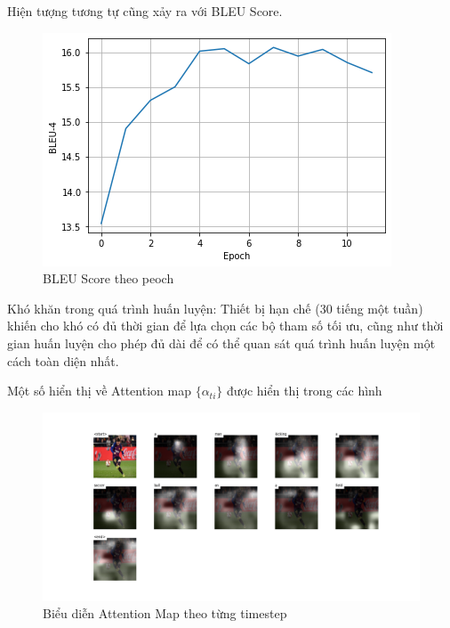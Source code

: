 \documentclass[14pt, a4paper]{article}
\numberwithin{equation}{section}
\numberwithin{algorithm}{section}
\numberwithin{figure}{section}
\numberwithin{table}{section}
\numberwithin{dl}{section}
\numberwithin{md}{section}
\numberwithin{bd}{section}
\numberwithin{dn}{section}
\numberwithin{hq}{section}
\begin{document}
    Hiện tượng tương tự cũng xảy ra với BLEU Score.

    \begin{figure}[h!] \centering

        \includegraphics[scale=0.6]{BLEU-4.png}
        \caption{BLEU Score theo peoch}
        \label{fig:BLEU-4}

    \end{figure}

    Khó khăn trong quá trình huấn luyện: Thiết bị hạn chế (30 tiếng một tuần) khiến cho khó có đủ thời gian để lựa chọn các bộ tham số tối ưu, 
    cũng như thời gian huấn luyện cho phép đủ dài để có thể quan sát quá trình huấn luyện một cách toàn diện nhất.

    Một số hiển thị về Attention map $\lbrace \alpha_{ti} \rbrace$ được hiển thị trong các hình 

    \begin{figure}[h!] \centering

        \includegraphics[scale=0.3]{Attention_Sample_1.png}
        \caption{Biểu diễn Attention Map theo từng timestep}
        \label{fig:Attention_Sample_1}

    \end{figure}
\end{document}
